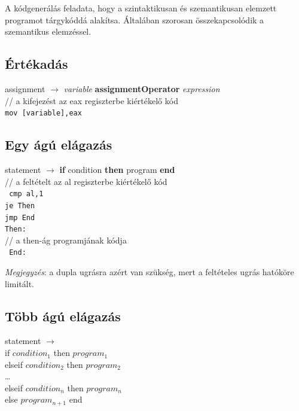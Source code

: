 \documentclass[12pt,margin=0px]{article}
\begin{document}
	A kódgenerálás feladata, hogy a szintaktikusan és szemantikusan elemzett programot tárgykóddá alakítsa. Általában szorosan összekapcsolódik a
	szemantikus elemzéssel.
\newpage	
    \subsection*{Értékadás}
	
	\noindent assignment $ \rightarrow $ \emph{variable} \textbf{assignmentOperator} \emph{expression}\\

    \noindent // a kifejezést az eax regiszterbe kiértékelő kód\\
	\noindent \texttt{mov [variable],eax}
	
    \subsection*{Egy ágú elágazás}
	
    \noindent statement $ \rightarrow $ \textbf{if} condition \textbf{then} program \textbf{end}\\
	
    \noindent // a feltételt az al regiszterbe kiértékelő kód\\
    \texttt{
	cmp al,1\\
	je Then\\
	jmp End\\
	Then: \\
    }
    // a then-ág programjának kódja\\
    \texttt{
	End:\\
    }
	
	\noindent \emph{Megjegyzés}: a dupla ugrásra azért van szükség, mert a feltételes ugrás hatóköre limitált.

    \subsection*{Több ágú elágazás}
	
	statement $ \rightarrow $
	\\if $ condition_1 $ then $ program_1 $
	\\elseif $ condition_2 $ then $ program_2 $
	\\\dots
	\\elseif $ condition_n $ then $ program_n $
	\\else $ program_{n+1} $ end\\
	
\end{document}
